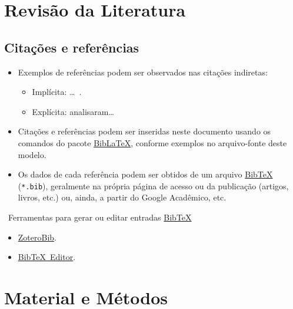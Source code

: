 \documentclass[%
  aspectratio = 169,%
  10pt,%
  t,%
  onlytextwidth,%
  compress,%
  handout,%
  xcolor = table,%
  english,%
  brazilian,%
]{beamer}
\begin{document}
\section{Revisão da Literatura}%
\label{sect:lit-rev}

\subsection{Citações e referências}

\begin{frame}

\begin{itemize}
\item Exemplos de referências podem ser observados nas citações indiretas:
\begin{itemize}
\item Implícita: \ldots\ \cite{Nriagu1988,Lamport1994,Ekenstein1997}.
\item Explícita: \textcite{Wizentier1992,Faina2000} analisaram\ldots%
\end{itemize}
\item Citações e referências podem ser inseridas neste documento usando os comandos do pacote \href{https://ctan.org/pkg/biblatex/}{Bib\LaTeX\LinkIcon}, conforme exemplos no arquivo-fonte deste modelo.
\item Os dados de cada referência podem ser obtidos de um arquivo \href{https://www.bibtex.org/}{Bib\TeX\LinkIcon} (\texttt{*.bib}), geralmente na própria página de acesso ou  da publicação (artigos, livros, etc.) ou, ainda, a partir do Google Acadêmico, etc.
\end{itemize}

\begin{alertblock}{\faInfoCircle\ Ferramentas para gerar ou editar entradas \href{https://www.bibtex.org/}{Bib\TeX\LinkIcon}}

\begin{itemize}
\item[\tiny\faTools] \href{https://zbib.org/}{ZoteroBib\LinkIcon}.
\item[\tiny\faTools] \href{https://truben.no/latex/bibtex/}{Bib\TeX\ Editor\LinkIcon}.
\end{itemize}

\end{alertblock}

\end{frame}

\section{Material e Métodos}%
\label{sect:mat-meth}
\end{document}
